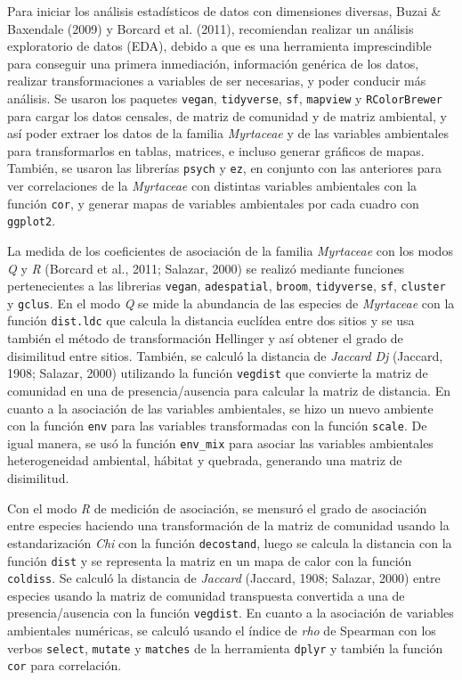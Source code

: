 \documentclass[11pt,]{article}
\begin{document}
Para iniciar los análisis estadísticos de datos con dimensiones
diversas, Buzai \& Baxendale (2009) y Borcard et al. (2011), recomiendan
realizar un análisis exploratorio de datos (EDA), debido a que es una
herramienta imprescindible para conseguir una primera inmediación,
información genérica de los datos, realizar transformaciones a variables
de ser necesarias, y poder conducir más análisis. Se usaron los paquetes
\texttt{vegan}, \texttt{tidyverse}, \texttt{sf}, \texttt{mapview} y
\texttt{RColorBrewer} para cargar los datos censales, de matriz de
comunidad y de matriz ambiental, y así poder extraer los datos de la
familia \emph{Myrtaceae} y de las variables ambientales para
transformarlos en tablas, matrices, e incluso generar gráficos de mapas.
También, se usaron las librerías \texttt{psych} y \texttt{ez}, en
conjunto con las anteriores para ver correlaciones de la
\emph{Myrtaceae} con distintas variables ambientales con la función
\texttt{cor}, y generar mapas de variables ambientales por cada cuadro
con \texttt{ggplot2}.

La medida de los coeficientes de asociación de la familia
\emph{Myrtaceae} con los modos \emph{Q} y \emph{R} (Borcard et al.,
2011; Salazar, 2000) se realizó mediante funciones pertenecientes a las
librerias \texttt{vegan}, \texttt{adespatial}, \texttt{broom},
\texttt{tidyverse}, \texttt{sf}, \texttt{cluster} y \texttt{gclus}. En
el modo \emph{Q} se mide la abundancia de las especies de
\emph{Myrtaceae} con la función \texttt{dist.ldc} que calcula la
distancia euclídea entre dos sitios y se usa también el método de
transformación Hellinger y así obtener el grado de disimilitud entre
sitios. También, se calculó la distancia de \emph{Jaccard} \emph{Dj}
(Jaccard, 1908; Salazar, 2000) utilizando la función \texttt{vegdist}
que convierte la matriz de comunidad en una de presencia/ausencia para
calcular la matriz de distancia. En cuanto a la asociación de las
variables ambientales, se hizo un nuevo ambiente con la función
\texttt{env} para las variables transformadas con la función
\texttt{scale}. De igual manera, se usó la función \texttt{env\_mix}
para asociar las variables ambientales heterogeneidad ambiental, hábitat
y quebrada, generando una matriz de disimilitud.

Con el modo \emph{R} de medición de asociación, se mensuró el grado de
asociación entre especies haciendo una transformación de la matriz de
comunidad usando la estandarización \emph{Chi} con la función
\texttt{decostand}, luego se calcula la distancia con la función
\texttt{dist} y se representa la matriz en un mapa de calor con la
función \texttt{coldiss}. Se calculó la distancia de \emph{Jaccard}
(Jaccard, 1908; Salazar, 2000) entre especies usando la matriz de
comunidad transpuesta convertida a una de presencia/ausencia con la
función \texttt{vegdist}. En cuanto a la asociación de variables
ambientales numéricas, se calculó usando el índice de \emph{rho} de
Spearman con los verbos \texttt{select}, \texttt{mutate} y
\texttt{matches} de la herramienta \texttt{dplyr} y también la función
\texttt{cor} para correlación.
\end{document}
